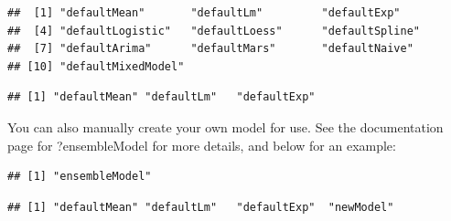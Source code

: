 \documentclass[nojss]{jss}
\begin{document}
\begin{knitrout}
\color{fgcolor}\begin{kframe}
\begin{alltt}
\hlopt{$}
\end{alltt}
\begin{verbatim}
##  [1] "defaultMean"       "defaultLm"         "defaultExp"       
##  [4] "defaultLogistic"   "defaultLoess"      "defaultSpline"    
##  [7] "defaultArima"      "defaultMars"       "defaultNaive"     
## [10] "defaultMixedModel"
\end{verbatim}
\begin{alltt}
\hlopt{$} \hlkwb{=}
    \hlopt{$}\hlstd{ensembleModels[}\hlopt{:}\hlstd{]}
\hlopt{$}
\end{alltt}
\begin{verbatim}
## [1] "defaultMean" "defaultLm"   "defaultExp"
\end{verbatim}
\end{kframe}
\end{knitrout}

You can also manually create your own model for use.  See the documentation
page for ?ensembleModel for more details, and below for an example:

\begin{knitrout}
\color{fgcolor}\begin{kframe}
\begin{alltt}
 \hlkwb{=} \hlstd{(}
     \hlstd{=} \hlstd{(}\hlstd{)\{}
        \hlstd{(}\hlstd{,} 
    \hlstd{\},}
     \hlstd{=} \hlstd{,}
     \hlstd{=} \hlstd{)}
\end{alltt}
\begin{verbatim}
## [1] "ensembleModel"
\end{verbatim}
\begin{alltt}
\hlopt{$} \hlkwb{=} \hlopt{$}
                                     
\hlopt{$}
\end{alltt}
\begin{verbatim}
## [1] "defaultMean" "defaultLm"   "defaultExp"  "newModel"
\end{verbatim}
\end{kframe}
\end{knitrout}
\end{document}
